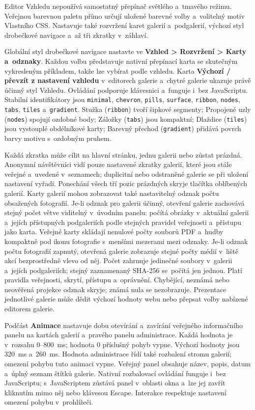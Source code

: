 \documentclass[11pt,a4paper]{article}
\newcommand{\ui}[1]{\textbf{#1}}
\newcommand{\codeword}[1]{\nolinkurl{#1}}
\begin{document}
Editor Vzhledu nepoužívá samostatný přepínač světlého a~tmavého režimu. Veřejnou
barevnou paletu přímo určují uložené barevné volby a~volitelný motiv Vlastního
CSS. Nastavuje také rozvržení karet galerií a~podgalerií, výchozí styl
drobečkové navigace a~až tři zkratky v~záhlaví.

Globální styl drobečkové navigace nastavte ve \ui{Vzhled > Rozvržení > Karty
a~odznaky}. Každou volbu představuje nativní přepínací karta se skutečným
vykresleným příkladem, takže lze vybírat podle vzhledu. Karta \ui{Výchozí /
převzít z nastavení vzhledu} v~editorech galerie a~chytré galerie ukazuje právě
účinný styl Vzhledu. Ovládání podporuje klávesnici a~funguje i~bez JavaScriptu.
Stabilní identifikátory jsou \codeword{minimal}, \codeword{chevron},
\codeword{pills}, \codeword{surface}, \codeword{ribbon}, \codeword{nodes},
\codeword{tabs}, \codeword{tiles} a~\codeword{gradient}. Stužka
(\codeword{ribbon}) tvoří šipkové segmenty; Propojené uzly (\codeword{nodes})
spojují ozdobné body; Záložky (\codeword{tabs}) jsou kompaktní; Dlaždice
(\codeword{tiles}) jsou vystouplé obdélníkové karty; Barevný přechod
(\codeword{gradient}) přidává povrch barvy motivu s~ozdobným pruhem.

Každá zkratka může cílit na hlavní stránku, jednu galerii nebo zůstat prázdná.
Anonymní návštěvníci vidí pouze nastavené zkratky galerií, které jsou stále
veřejné a~uvedené v~seznamech; duplicitní nebo odstraněné galerie se při uložení
nastavení vyřadí. Ponechání všech tří pozic prázdných skryje tlačítka oblíbených
galerií. Karty galerií mohou zobrazovat také nastavitelný odznak počtu
obsažených fotografií. Je-li odznak pro galerii účinný, otevření galerie
zachovává stejný počet větve viditelný v~úvodním panelu: počítá obrázky
v~aktuální galerii a~jejích přístupných podgaleriích podle stejných pravidel
veřejnosti a~přístupu jako karta. Veřejné karty skládají nenulové počty souborů
PDF a~hudby kompaktně pod ikonu fotografie s~menšími mezerami mezi odznaky.
Je-li odznak počtu fotografií zapnutý, otevřená galerie zobrazuje stejné počty
médií v~liště akcí bezprostředně vlevo od něj. Počet zahrnuje jedinečné soubory
v~galerii a~jejích podgaleriích; stejný zaznamenaný SHA-256 se~počítá jen
jednou. Platí pravidla veřejnosti, skrytí, přístupu a~oprávnění. Chybějící,
neznámá nebo neověřená projekce odznak skryje; známá nula se nezobrazuje.
Prezentace jednotlivé galerie může dědit výchozí hodnoty webu nebo přepsat volby
nabízené editorem galerie.

Podčást \ui{Animace} nastavuje dobu otevírání a~zavírání veřejného informačního
panelu na kartách galerií a~pravého panelu administrace. Každá hodnota je
v~rozsahu 0--800~ms; hodnota 0 příslušný pohyb vypne. Výchozí hodnoty jsou
320~ms a~260~ms. Hodnota administrace řídí také rozbalení stromu galerií;
omezení pohybu tuto animaci vypne. Veřejný panel obsahuje název, popis, datum a~úplný seznam
štítků galerie. Nativní rozbalovací ovládání funguje i~bez JavaScriptu;
s~JavaScriptem zůstává panel v~oblasti okna a~lze jej zavřít kliknutím mimo něj
nebo klávesou Escape. Interakce respektuje nastavení omezení pohybu
v~prohlížeči.
\end{document}
